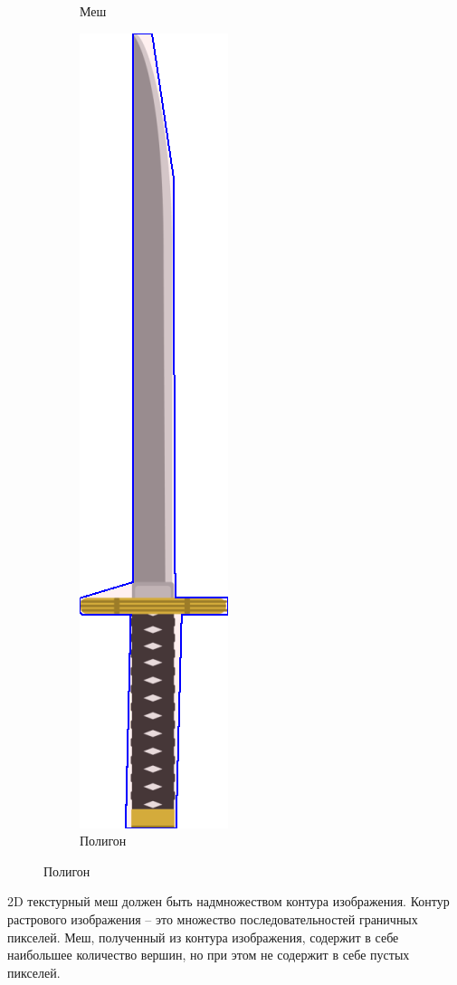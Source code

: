 \documentclass{fefu_thesis/cls/fefu}
\begin{document}
\begin{figure}[H]
\begin{subfigure}[c]{.49\linewidth}
            \caption{Меш}
        \end{subfigure}
        \begin{subfigure}[c]{.49\linewidth}
            \centering
            \includegraphics{images/katana_15v_polygon.png}
            \caption{Полигон}
        \end{subfigure}
    \end{figure}

    2D текстурный меш должен быть надмножеством контура изображения. Контур растрового изображения -- это множество последовательностей граничных пикселей. Меш, полученный из контура изображения, содержит в себе наибольшее количество вершин, но при этом не содержит в себе пустых пикселей.
\end{document}

